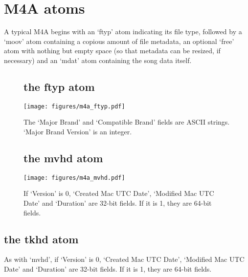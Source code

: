 \section{M4A atoms}
A typical M4A begins with an `ftyp' atom indicating its file type,
followed by a `moov' atom containing a copious amount of file metadata,
an optional `free' atom with nothing but empty space
(so that metadata can be resized, if necessary) and an `mdat' atom
containing the song data itself.
\begin{figure}[h]
\subsection{the ftyp atom}
\texttt{[image: figures/m4a\_ftyp.pdf]}
\par
The `Major Brand' and `Compatible Brand' fields are ASCII strings.
`Major Brand Version' is an integer.

\subsection{the mvhd atom}
\texttt{[image: figures/m4a\_mvhd.pdf]}
\par
If `Version' is 0, `Created Mac UTC Date', `Modified Mac UTC Date' and
`Duration' are 32-bit fields.  If it is 1, they are 64-bit fields.
\end{figure}

\pagebreak

\subsection{the tkhd atom}
As with `mvhd', if `Version' is 0, `Created Mac UTC Date',
`Modified Mac UTC Date' and `Duration' are 32-bit fields.
If it is 1, they are 64-bit fields.

